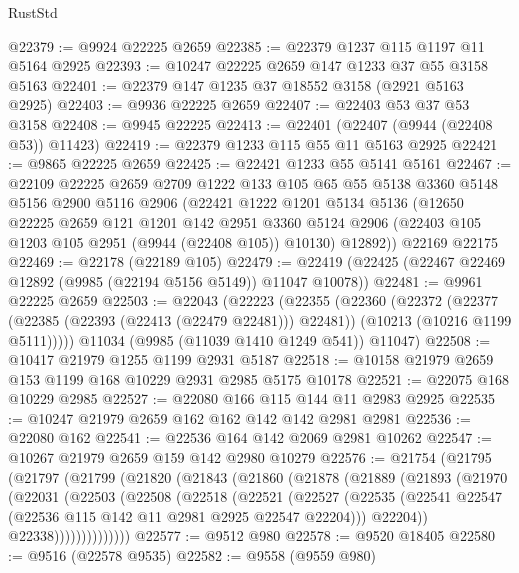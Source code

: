 \begin{lexlean}{RustStd}
\begin{coremodule}
@22379 := @9924 @22225 @2659
@22385 := @22379 @1237 @115 @1197 @11 @5164 @2925
@22393 := @10247 @22225 @2659 @147 @1233 @37 @55 @3158 @5163
@22401 := @22379 @147 @1235 @37 @18552 @3158 (@2921 @5163 @2925)
@22403 := @9936 @22225 @2659
@22407 := @22403 @53 @37 @53 @3158
@22408 := @9945 @22225
@22413 := @22401 (@22407 (@9944 (@22408 @53)) @11423)
@22419 := @22379 @1233 @115 @55 @11 @5163 @2925
@22421 := @9865 @22225 @2659
@22425 := @22421 @1233 @55 @5141 @5161
@22467 := @22109
    @22225
    @2659
    @2709
    @1222
    @133
    @105
    @65
    @55
    @5138
    @3360
    @5148
    @5156
    @2900
    @5116
    @2906
    (@22421
      @1222
      @1201
      @5134
      @5136
      (@12650
        @22225
        @2659
        @121
        @1201
        @142
        @2951
        @3360
        @5124
        @2906
        (@22403 @105 @1203 @105 @2951 (@9944 (@22408 @105)) @10130)
        @12892))
    @22169
    @22175
@22469 := @22178 (@22189 @105)
@22479 := @22419 (@22425 (@22467 @22469 @12892 (@9985 (@22194 @5156 @5149)) @11047 @10078))
@22481 := @9961 @22225 @2659
@22503 := @22043
    (@22223
      (@22355
        (@22360
          (@22372
            (@22377 (@22385 (@22393 (@22413 (@22479 @22481))) @22481))
            (@10213 (@10216 @1199 @5111)))))
      @11034
      (@9985 (@11039 @1410 @1249 @541))
      @11047)
@22508 := @10417 @21979 @1255 @1199 @2931 @5187
@22518 := @10158 @21979 @2659 @153 @1199 @168 @10229 @2931 @2985 @5175 @10178
@22521 := @22075 @168 @10229 @2985
@22527 := @22080 @166 @115 @144 @11 @2983 @2925
@22535 := @10247 @21979 @2659 @162 @162 @142 @142 @2981 @2981
@22536 := @22080 @162
@22541 := @22536 @164 @142 @2069 @2981 @10262
@22547 := @10267 @21979 @2659 @159 @142 @2980 @10279
@22576 := @21754
    (@21795
      (@21797
        (@21799
          (@21820
            (@21843
              (@21860
                (@21878
                  (@21889
                    (@21893
                      (@21970
                        (@22031
                          (@22503
                            (@22508
                              (@22518
                                (@22521
                                  (@22527
                                    (@22535
                                      (@22541
                                        @22547
                                        (@22536 @115 @142 @11 @2981 @2925 @22547 @22204)))
                                    @22204))
                                @22338))))))))))))))
@22577 := @9512 @980
@22578 := @9520 @18405
@22580 := @9516 (@22578 @9535)
@22582 := @9558 (@9559 @980)

\end{coremodule}
\end{lexlean}
